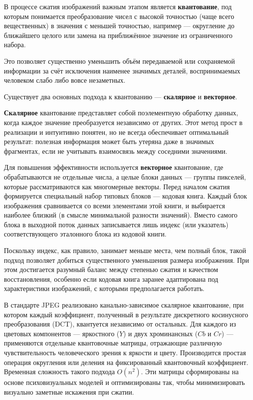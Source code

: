 В процессе сжатия изображений важным этапом является \textbf{квантование}, 
под которым понимается преобразование чисел с высокой точностью (чаще всего вещественных) в значения с меньшей точностью, 
например — округление до ближайшего целого или замена на приближённое значение из ограниченного набора. 

Это позволяет существенно уменьшить объём передаваемой или сохраняемой информации за счёт исключения наименее значимых деталей, 
воспринимаемых человеком слабо либо вовсе незаметных.

Существует два основных подхода к квантованию — \textbf{скалярное} и \textbf{векторное}.

\textbf{Скалярное} квантование представляет собой поэлементную обработку данных, 
когда каждое значение преобразуется независимо от других. 
Этот метод прост в реализации и интуитивно понятен, но не всегда обеспечивает оптимальный результат: 
полезная информация может быть утеряна даже в значимых фрагментах, если не учитывать взаимосвязь между соседними значениями.

Для повышения эффективности используется \textbf{векторное} квантование, где обрабатываются не отдельные числа, 
а целые блоки данных — группы пикселей, которые рассматриваются как многомерные векторы. 
Перед началом сжатия формируется специальный набор типовых блоков — кодовая книга. 
Каждый блок изображения сравнивается со всеми элементами этой книги, и выбирается наиболее близкий (в смысле минимальной разности значений). 
Вместо самого блока в выходной поток данных записывается лишь индекс (или указатель) соответствующего эталонного блока из кодовой книги.

Поскольку индекс, как правило, занимает меньше места, чем полный блок, такой подход позволяет добиться существенного уменьшения размера изображения. 
При этом достигается разумный баланс между степенью сжатия и качеством восстановления, 
особенно если кодовая книга заранее адаптирована под характеристики изображений, с которыми предполагается работать.

В стандарте JPEG реализовано канально-зависимое скалярное квантование, при котором каждый коэффициент, 
полученный в результате дискретного косинусного преобразования (DCT), квантуется независимо от остальных. 
Для каждого из цветовых компонентов — яркостного ($Y$) и двух хроминансных ($Cb$ и $Cr$) — применяются отдельные квантовочные матрицы, 
отражающие различную чувствительность человеческого зрения к яркости и цвету. Производится простая операция 
округления или деления на фиксированный квантовочный коэффициент. Временная сложность такого подхода $O(n^2)$.
Эти матрицы сформированы на основе психовизуальных моделей и оптимизированы так, 
чтобы минимизировать визуально заметные искажения при сжатии.


